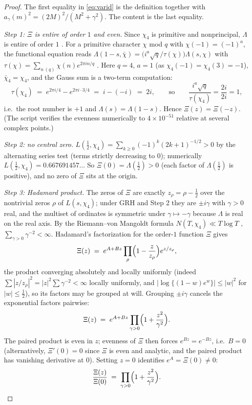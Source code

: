 \begin{proof}
The first equality in \eqref{eq:varid} is the definition together with
$a_\gamma(m)^2=(2M)^2/(M^2+\gamma^2)$. The content is the last
equality.

\emph{Step 1: $\Xi$ is entire of order $1$ and even.} Since $\chi_4$ is
primitive and nonprincipal, $\Lambda$ is entire of order $1$
\cite[Chs.~9, 12]{Dav00}. For a primitive character $\chi$ mod $q$ with
$\chi(-1)=(-1)^a$, the functional equation reads
$\Lambda(1-s,\bar\chi)=\bigl(i^a\sqrt q/\tau(\chi)\bigr)\Lambda(s,\chi)$
with $\tau(\chi)=\sum_{n\ (q)}\chi(n)e^{2\pi in/q}$ \cite[Ch.~9]{Dav00}.
Here $q=4$, $a=1$ (as $\chi_4(-1)=\chi_4(3)=-1$), $\bar\chi_4=\chi_4$,
and the Gauss sum is a two-term computation:
\[
\tau(\chi_4)\;=\;e^{2\pi i/4}-e^{2\pi i\cdot3/4}\;=\;i-(-i)\;=\;2i,
\qquad\text{so}\qquad
\frac{i^a\sqrt q}{\tau(\chi_4)}=\frac{2i}{2i}=1,
\]
i.e.\ the root number is $+1$ and $\Lambda(s)=\Lambda(1-s)$. Hence
$\Xi(z)=\Xi(-z)$. (The script verifies the evenness numerically to
$4\times10^{-51}$ relative at several complex points.)

\emph{Step 2: no central zero.} $L(\tfrac12,\chi_4)
=\sum_{k\ge0}(-1)^k(2k+1)^{-1/2}>0$ by the alternating series test
(terms strictly decreasing to $0$); numerically
$L(\tfrac12,\chi_4)=0.667691457\ldots$ So $\Xi(0)=\Lambda(\tfrac12)>0$
(each factor of $\Lambda(\tfrac12)$ is positive), and no zero of $\Xi$
sits at the origin.

\emph{Step 3: Hadamard product.} The zeros of $\Xi$ are exactly
$z_\rho=\rho-\tfrac12$ over the nontrivial zeros $\rho$ of
$L(s,\chi_4)$; under GRH and Step 2 they are $\pm i\gamma$ with
$\gamma>0$ real, and the multiset of ordinates is symmetric under
$\gamma\mapsto-\gamma$ because $\Lambda$ is real on the real axis. By
the Riemann--von Mangoldt formula $N(T,\chi_4)\ll T\log T$
\cite[\S16]{Dav00}, $\sum_{\gamma>0}\gamma^{-2}<\infty$. Hadamard's
factorization for the order-$1$ function $\Xi$ gives
\[
\Xi(z)\;=\;e^{A+Bz}\prod_{\rho}\Bigl(1-\frac{z}{z_\rho}\Bigr)e^{z/z_\rho},
\]
the product converging absolutely and locally uniformly (indeed
$\sum|z/z_\rho|^2=|z|^2\sum\gamma^{-2}<\infty$ locally uniformly, and
$|\log\{(1-w)e^{w}\}|\le|w|^2$ for $|w|\le\tfrac12$), so its factors
may be grouped at will. Grouping $\pm i\gamma$ cancels the exponential
factors pairwise:
\[
\Xi(z)\;=\;e^{A+Bz}\prod_{\gamma>0}\Bigl(1+\frac{z^2}{\gamma^2}\Bigr).
\]
The paired product is even in $z$; evenness of $\Xi$ then forces
$e^{Bz}=e^{-Bz}$, i.e.\ $B=0$ (alternatively, $\Xi'(0)=0$ since $\Xi$
is even and analytic, and the paired product has vanishing derivative
at $0$). Setting $z=0$ identifies $e^A=\Xi(0)\ne0$:
\begin{equation}\label{eq:hadamard}
\frac{\Xi(z)}{\Xi(0)}\;=\;\prod_{\gamma>0}
\Bigl(1+\frac{z^2}{\gamma^2}\Bigr).
\end{equation}


\end{proof}
